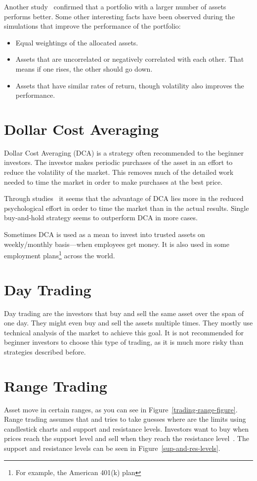 Another study~\cite{rebalancing-strategy} confirmed that a portfolio with a larger number of assets performs better. Some other interesting facts have been observed during the simulations that improve the performance of the portfolio:
\begin{itemize}
    \item Equal weightings of the allocated assets.
    \item Assets that are uncorrelated or negatively correlated with each other. That means if one rises, the other should go down.
    \item Assets that have similar rates of return, though volatility also improves the performance.
\end{itemize}

\section{Dollar Cost Averaging}
\label{section-dca}
Dollar Cost Averaging (DCA) is a strategy often recommended to the beginner investors. The investor makes periodic purchases of the asset in an effort to reduce the volatility of the market. This removes much of the detailed work needed to time the market in order to make purchases at the best price.

Through studies~\cite{DCA-study} it seems that the advantage of DCA lies more in the reduced psychological effort in order to time the market than in the actual results. Single buy-and-hold strategy seems to outperform DCA in more cases.

Sometimes DCA is used as a mean to invest into trusted assets on weekly/monthly basis---when employees get money. It is also used in some employment plans\footnote{For example, the American 401(k) plan} across the world.

\section{Day Trading}
Day trading are the investors that buy and sell the same asset over the span of one day. They might even buy and sell the assets multiple times. They mostly use technical analysis of the market to achieve this goal. It is not recommended for beginner investors to choose this type of trading, as it is much more risky than strategies described before.

\section{Range Trading}
\label{section-range-trading}
Asset move in certain ranges, as you can see in Figure~\ref{trading-range-figure}. Range trading assumes that and tries to take guesses where are the limits using candlestick charts and support and resistance levels. Investors want to buy when prices reach the support level and sell when they reach the resistance level~\cite{5types-of-daytrading}. The support and resistance levels can be seen in Figure~\ref{sup-and-res-levels}.

